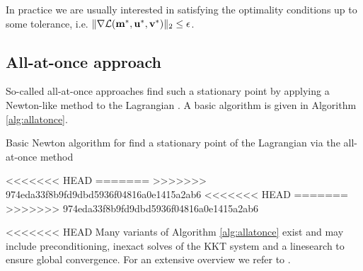 \documentclass{iopart}
\begin{document}
{In practice we are usually interested in satisfying the optimality conditions up to some 
tolerance, i.e. $\|\nabla \mathcal{L}(\mathbf{m}^*,\mathbf{u}^*,\mathbf{v}^*)\|_2\leq \epsilon$.

\subsection{All-at-once approach}
So-called all-at-once approaches find such a stationary point by applying a Newton-like method to the Lagrangian \cite{Haber2000}. A basic algorithm is given in Algorithm \ref{alg:allatonce}.
%
\begin{algorithm}
\caption{Basic Newton algorithm for find a stationary point of the Lagrangian via the all-at-once method}
\label{alg:allatonce}
\begin{algorithmic}
<<<<<<< HEAD
=======
\vspace{1mm}
>>>>>>> 974eda33f8b9fd9dbd5936f04816a0e1415a2ab6
<<<<<<< HEAD
=======
\vspace{1mm}
\STATE{determine steplength $\alpha^k \in (0,1]$}
\vspace{1mm}
\vspace{1mm}
\vspace{1mm}
>>>>>>> 974eda33f8b9fd9dbd5936f04816a0e1415a2ab6
\ENDWHILE
\end{algorithmic}
\end{algorithm}
%
<<<<<<< HEAD
Many variants of Algorithm \ref{alg:allatonce} exist and may include preconditioning, inexact solves of the KKT system and a linesearch to ensure global convergence. For an extensive overview we refer to \cite{Herzog2010}.

}
\end{document}
